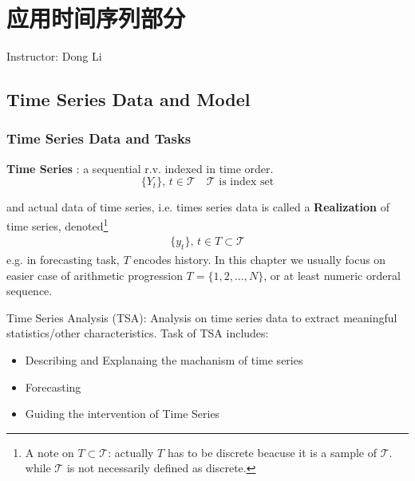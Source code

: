 \chapter{应用时间序列部分}
\begin{center}
    Instructor: Dong Li
\end{center}


\section{Time Series Data and Model}


\subsection{Time Series Data and Tasks}
    \textbf{Time Series} : a sequential r.v. indexed in time order.
    \begin{equation}
        \{Y_t\},\,t\in \mathcal{T}\quad \mathcal{T}\text{ is index set} 
    \end{equation}

    and actual data of time series, i.e. times series data is called a \textbf{Realization}  of time series, denoted\footnote{A note on $ T\subset \mathcal{T} $: actually $ T $ has to be discrete beacuse it is a sample of $ \mathcal{T} $. while $ \mathcal{T} $ is not necessarily defined as discrete.}
    \begin{align}
        \{y_t\},\,t\in  T\subset\mathcal{T}
    \end{align}
    e.g. in forecasting task, $ T $ encodes history. In this chapter we usually focus on easier case of arithmetic progression $ T=\{1,2,\dots,N\} $, or at least numeric orderal sequence.

    Time Series Analysis (TSA): Analysis on time series data to extract meaningful statistics/other characteristics. Task of TSA includes:
    \begin{itemize}[topsep=2pt,itemsep=0pt]
        \item Describing and Explanaing the machanism of time series 
        \item Forecasting
        \item Guiding the intervention of Time Series
    \end{itemize}

